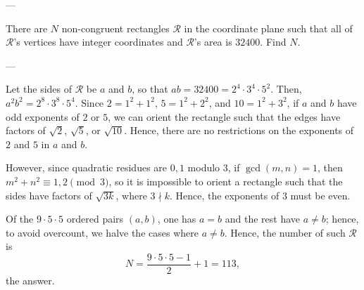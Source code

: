 
---

There are $N$ non-congruent rectangles $\mathcal R$ in the coordinate plane such that all of $\mathcal R$'s vertices have integer coordinates and $\mathcal R$'s area is $32400$. Find $N$.

---

Let the sides of $\mathcal R$ be $a$ and $b$, so that $ab=32400=2^4\cdot 3^4\cdot 5^2$. Then, $a^2b^2=2^8\cdot 3^8\cdot 5^4$. Since $2=1^2+1^2$, $5=1^2+2^2$, and $10=1^2+3^2$, if $a$ and $b$ have odd exponents of $2$ or $5$, we can orient the rectangle such that the edges have factors of $\sqrt2$, $\sqrt5$, or $\sqrt{10}$. Hence, there are no restrictions on the exponents of $2$ and $5$ in $a$ and $b$.

However, since quadratic residues are $0,1$ modulo $3$, if $\gcd(m,n)=1$, then $m^2+n^2\equiv 1,2\pmod{3}$, so it is impossible to orient a rectangle such that the sides have factors of $\sqrt{3k}$, where $3\nmid k$. Hence, the exponents of $3$ must be even.

Of the $9\cdot 5\cdot 5$ ordered pairs $(a,b)$, one has $a=b$ and the rest have $a\ne b$; hence, to avoid overcount, we halve the cases where $a\ne b$. Hence, the number of such $\mathcal R$ is \[N=\frac{9\cdot 5\cdot 5-1}2+1=113,\]
the answer.

